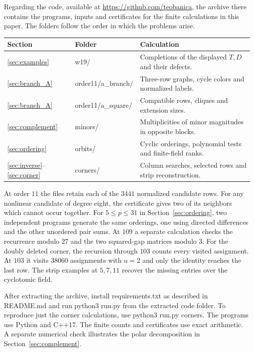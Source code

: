 \documentclass[11pt,a4paper]{article}
\numberwithin{equation}{section}
\begin{document}
\medskip
Regarding the code, available at \url{https://github.com/teobanica}, the archive there contains the programs, inputs and certificates for the finite calculations in this paper. The folders follow the order in which the problems arise.
\begin{center}
\small
\begin{tabular}{@{}lll@{}}
\toprule
Section & Folder & Calculation\\
\midrule
\ref{sec:examples} & w19/ & Completions of the displayed $T,D$ and their defects.\\
\ref{sec:branch_A} & order11/a\_branch/ & Three-row graphs, cycle colors and normalized labels.\\
\ref{sec:branch_A} & order11/a\_square/ & Compatible rows, cliques and extension sizes.\\
\ref{sec:complement} & minors/ & Multiplicities of minor magnitudes in opposite blocks.\\
\ref{sec:ordering} & orbits/ & Cyclic orderings, polynomial tests and finite-field ranks.\\
\ref{sec:inverse}--\ref{sec:corner} & corners/ & Column searches, selected rows and strip reconstruction.\\
\bottomrule
\end{tabular}
\end{center}

At order $11$ the files retain each of the $3441$ normalized candidate rows. For any nonlinear candidate of degree eight, the certificate gives two of its neighbors which cannot occur together. For $5\le p\le31$ in Section~\ref{sec:ordering}, two independent programs generate the same orderings, one using directed differences and the other unordered pair sums. At $109$ a separate calculation checks the recurrence modulo $27$ and the two squared-gap matrices modulo $3$. For the doubly deleted corner, the recursion through $103$ counts every visited assignment. At $103$ it visits $38060$ assignments with $u=2$ and only the identity reaches the last row. The strip examples at $5,7,11$ recover the missing entries over the cyclotomic field.

After extracting the archive, install requirements.txt as described in README.md and run python3 run.py from the extracted code folder. To reproduce just the corner calculations, use python3 run.py corners. The programs use Python and C++17. The finite counts and certificates use exact arithmetic. A separate numerical check illustrates the polar decomposition in Section~\ref{sec:complement}.
\end{document}
